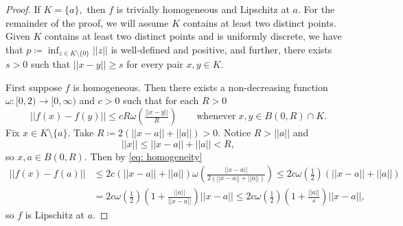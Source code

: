 \documentclass{article}
\begin{document}
\begin{proof} If $K = \{a\},$ then $f$ is trivially homogeneous and Lipschitz at $a$. For the remainder of the proof, we will assume $K$ contains at least two distinct points. Given $K$ contains at least two distinct points and is uniformly discrete, we have that $p \coloneqq \inf_{z \in K \setminus \{0\}} ||z||$ is well-defined and positive, and further, there exists $s>0$ such that $||x-y||\geq s$ for every pair $x,y \in K.$

    First suppose $f$ is homogeneous. Then there exists a non-decreasing function $\omega:[0,2) \to [0,\infty)$ and $c>0$ such that for each $R>0$ 
    \begin{equation} \label{eq: homogeneity}
        ||f(x)-f(y)|| \leq cR \omega\left(\tfrac{||x-y||}{R}\right) \qquad \text{whenever} \; x,y \in B(0,R) \cap K.
    \end{equation}
Fix $x \in K\setminus \{a\}.$ Take $R \coloneqq 2(||x-a||+||a||)>0.$ Notice $R >||a||$ and 
$$||x|| \leq ||x-a|| + ||a|| < R,$$ so $x,a \in B(0,R).$ Then by \eqref{eq: homogeneity}
\begin{equation*}
    \begin{split}
        ||f(x)-f(a)|| &\leq 2c(||x-a||+||a||) \omega\left(\tfrac{||x-a||}{2(||x-a||+||a||)}\right) \leq  2c\omega\left(\tfrac{1}{2}\right)(||x-a||+||a||)
        \\&= 2c\omega\left(\tfrac{1}{2}\right)\left(1+\tfrac{||a||}{||x-a||}\right)||x-a|| \leq 2c\omega\left(\tfrac{1}{2}\right)\left(1+\tfrac{||a||}{s}\right)||x-a||,
    \end{split}
\end{equation*}
so $f$ is Lipschitz at $a$.


\end{proof}
\end{document}
